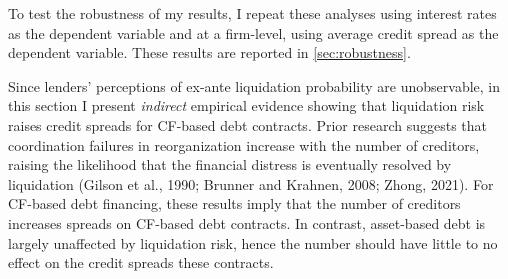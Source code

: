 \documentclass[12pt]{article}
\begin{document}
\begin{table}[H]
    \centering
    \caption{\small The main determinants of credit spreads of new loan issuances. Firm level controls include sector and credit rating dummies, the logarithm of firm age and employment, and the share of CF-based debt relative to total debt. Robust standard errors are reported in parentheses, *** p$<$0.01, ** p$<$0.05, * p$<$0.1. The full regression table is reported in section \ref{sec:credit spreads} of the appendix.}
    \label{tab:spread_table}

\end{table}

\noindent To test the robustness of my results, I repeat these analyses using interest rates as the dependent variable and at a firm-level, using average credit spread as the dependent variable. These results are reported in \ref{sec:robustness}. 

Since lenders' perceptions of ex-ante liquidation probability are unobservable, in this section I present \textit{indirect} empirical evidence  showing that liquidation risk raises credit spreads for CF-based debt contracts. Prior research suggests that coordination failures in reorganization increase with the number of creditors, raising the likelihood that the financial distress is eventually resolved by liquidation (Gilson et al., 1990; Brunner and Krahnen, 2008; Zhong, 2021). For CF-based debt financing, these results imply that the number of creditors increases spreads on CF-based debt contracts. In contrast, asset-based debt is largely unaffected by liquidation risk, hence the number should have little to no effect on the credit spreads these contracts. 
\end{document}
